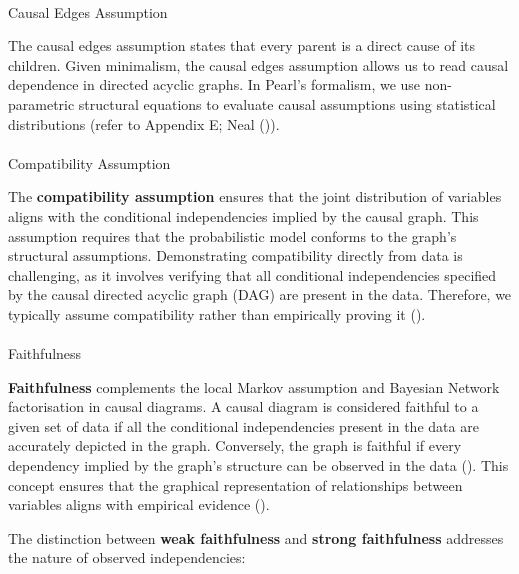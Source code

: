 \documentclass[
  single column]{article}
\makeatletter
\let\oldparagraph\paragraph
\renewcommand{\paragraph}{
    \@ifstar
      \xxxParagraphStar
      \xxxParagraphNoStar
  }
\newcommand{\xxxParagraphStar}[1]{\oldparagraph*{#1}\mbox{}}
\newcommand{\xxxParagraphNoStar}[1]{\oldparagraph{#1}\mbox{}}
\makeatother
\begin{document}
\paragraph{Causal Edges Assumption}\label{causal-edges-assumption}

The causal edges assumption states that every parent is a direct cause
of its children. Given minimalism, the causal edges assumption allows us
to read causal dependence in directed acyclic graphs. In Pearl's
formalism, we use non-parametric structural equations to evaluate causal
assumptions using statistical distributions (refer to Appendix E; Neal
()).

\paragraph{Compatibility Assumption}\label{compatibility-assumption}

The \textbf{compatibility assumption} ensures that the joint
distribution of variables aligns with the conditional independencies
implied by the causal graph. This assumption requires that the
probabilistic model conforms to the graph's structural assumptions.
Demonstrating compatibility directly from data is challenging, as it
involves verifying that all conditional independencies specified by the
causal directed acyclic graph (DAG) are present in the data. Therefore,
we typically assume compatibility rather than empirically proving it
().

\paragraph{Faithfulness}\label{faithfulness}

\textbf{Faithfulness} complements the local Markov assumption and
Bayesian Network factorisation in causal diagrams. A causal diagram is
considered faithful to a given set of data if all the conditional
independencies present in the data are accurately depicted in the graph.
Conversely, the graph is faithful if every dependency implied by the
graph's structure can be observed in the data
(). This concept ensures
that the graphical representation of relationships between variables
aligns with empirical evidence ().

The distinction between \textbf{weak faithfulness} and \textbf{strong
faithfulness} addresses the nature of observed independencies:
\end{document}
